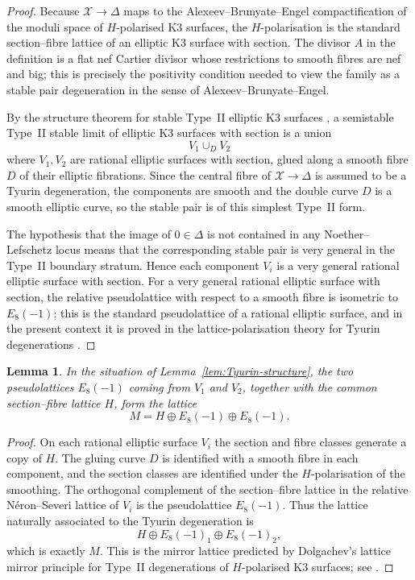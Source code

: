 \documentclass[11pt]{amsart}
\newtheorem{lemma}{Lemma}
\theoremstyle{definition}
\newcommand{\cX}{\mathcal X}
\begin{document}
\begin{proof}
Because $\cX\to\Delta$ maps to the Alexeev--Brunyate--Engel compactification of the moduli space of $H$-polarised K3 surfaces, the $H$-polarisation is the standard section--fibre lattice of an elliptic K3 surface with section. The divisor $A$ in the definition is a flat nef Cartier divisor whose restrictions to smooth fibres are nef and big; this is precisely the positivity condition needed to view the family as a stable pair degeneration in the sense of Alexeev--Brunyate--Engel.

By the structure theorem for stable Type~II elliptic K3 surfaces \cite{ABE22}, a semistable Type~II stable limit of elliptic K3 surfaces with section is a union
\[
V_1\cup_D V_2
\]
where $V_1,V_2$ are rational elliptic surfaces with section, glued along a smooth fibre $D$ of their elliptic fibrations. Since the central fibre of $\cX\to\Delta$ is assumed to be a Tyurin degeneration, the components are smooth and the double curve $D$ is a smooth elliptic curve, so the stable pair is of this simplest Type~II form.

The hypothesis that the image of $0\in\Delta$ is not contained in any Noether--Lefschetz locus means that the corresponding stable pair is very general in the Type~II boundary stratum. Hence each component $V_i$ is a very general rational elliptic surface with section. For a very general rational elliptic surface with section, the relative pseudolattice with respect to a smooth fibre is isometric to $E_8(-1)$; this is the standard pseudolattice of a rational elliptic surface, and in the present context it is proved in the lattice-polarisation theory for Tyurin degenerations \cite[Theorems~3.26 and~3.28]{GT24}.
\end{proof}

\begin{lemma}\label{lem:pseudolattice-gluing}
In the situation of Lemma~\ref{lem:Tyurin-structure}, the two pseudolattices $E_8(-1)$ coming from $V_1$ and $V_2$, together with the common section--fibre lattice $H$, form the lattice
\[
M=H\oplus E_8(-1)\oplus E_8(-1).
\]
\end{lemma}

\begin{proof}
On each rational elliptic surface $V_i$ the section and fibre classes generate a copy of $H$. The gluing curve $D$ is identified with a smooth fibre in each component, and the section classes are identified under the $H$-polarisation of the smoothing. The orthogonal complement of the section--fibre lattice in the relative Néron--Severi lattice of $V_i$ is the pseudolattice $E_8(-1)$. Thus the lattice naturally associated to the Tyurin degeneration is
\[
H\oplus E_8(-1)_1\oplus E_8(-1)_2,
\]
which is exactly $M$. This is the mirror lattice predicted by Dolgachev's lattice mirror principle for Type~II degenerations of $H$-polarised K3 surfaces; see \cite[Theorem~3.28]{GT24}.
\end{proof}
\end{document}
